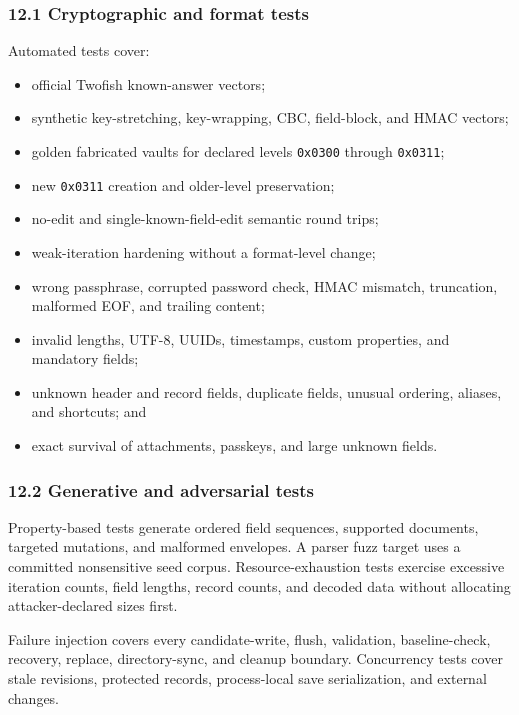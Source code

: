 \documentclass[
  letterpaper,
]{article}
\newcommand{\passthrough}[1]{#1}
\providecommand{\tightlist}{%
  \setlength{\itemsep}{0pt}\setlength{\parskip}{0pt}}
\begin{document}
\subsubsection{12.1 Cryptographic and format tests}\label{121-cryptographic-and-format-tests}

Automated tests cover:

\begin{itemize}
\tightlist
\item
  official Twofish known-answer vectors;
\item
  synthetic key-stretching, key-wrapping, CBC, field-block, and HMAC vectors;
\item
  golden fabricated vaults for declared levels \passthrough{\lstinline!0x0300!} through
  \passthrough{\lstinline!0x0311!};
\item
  new \passthrough{\lstinline!0x0311!} creation and older-level preservation;
\item
  no-edit and single-known-field-edit semantic round trips;
\item
  weak-iteration hardening without a format-level change;
\item
  wrong passphrase, corrupted password check, HMAC mismatch, truncation, malformed EOF, and trailing content;
\item
  invalid lengths, UTF-8, UUIDs, timestamps, custom properties, and mandatory fields;
\item
  unknown header and record fields, duplicate fields, unusual ordering, aliases, and shortcuts; and
\item
  exact survival of attachments, passkeys, and large unknown fields.
\end{itemize}

\subsubsection{12.2 Generative and adversarial tests}\label{122-generative-and-adversarial-tests}

Property-based tests generate ordered field sequences, supported documents, targeted mutations, and malformed envelopes.
A parser fuzz target uses a committed nonsensitive seed corpus. Resource-exhaustion tests exercise excessive iteration
counts, field lengths, record counts, and decoded data without allocating attacker-declared sizes first.

Failure injection covers every candidate-write, flush, validation, baseline-check, recovery, replace, directory-sync,
and cleanup boundary. Concurrency tests cover stale revisions, protected records, process-local save serialization, and
external changes.
\end{document}
